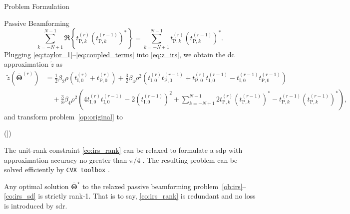 \begin{section}{Problem Formulation}
\begin{subsection}{Passive Beamforming}
		\begin{equation}\label{eq:coupled_terms}
			\sum_{k=-N+1}^{N-1} \Re\left\{t_{\mathrm{P},k}^{(r)} (t_{\mathrm{P},k}^{(r-1)})^*\right\} = \sum_{k=-N+1}^{N-1} t_{\mathrm{P},k}^{(r)} (t_{\mathrm{P},k}^{(r-1)})^*.
		\end{equation}
		Plugging \eqref{eq:taylor_1}--\eqref{eq:coupled_terms} into \eqref{eq:z_irs}, we obtain the \gls{dc} approximation $\tilde{z}$ as
		\begin{equation}
			\begin{split}
				\tilde{z}(\bar{\mathbf{\Theta}}^{(r)})
				& = \frac{1}{2}{\beta_2}{\rho}(t_{\mathrm{I},0}^{(r)}+t_{\mathrm{P},0}^{(r)}) + \frac{3}{2}{\beta_4}{\rho^2} \left(t_{\mathrm{I},0}^{(r)} t_{\mathrm{P},0}^{(r-1)} + t_{\mathrm{P},0}^{(r)} t_{\mathrm{I},0}^{(r-1)} - t_{\mathrm{I},0}^{(r-1)} t_{\mathrm{P},0}^{(r-1)}\right)\\
				& \quad + \frac{3}{8}{\beta_4}{\rho^2} \left(4 t_{\mathrm{I},0}^{(r)}t_{\mathrm{I},0}^{(r-1)} - 2 (t_{\mathrm{I},0}^{(r-1)})^2 + \sum_{k=-N+1}^{N-1}{2 t_{\mathrm{P},k}^{(r)} (t_{\mathrm{P},k}^{(r-1)})^* - t_{\mathrm{P},k}^{(r-1)} (t_{\mathrm{P},k}^{(r-1)})^*}\right), \label{eq:z_irs_approx}
			\end{split}
		\end{equation}
		and transform problem~\eqref{op:original} to
		\begin{maxi!}
			{\scriptstyle{\bar{\mathbf{\Theta}}}}{(\bar{\mathbf{\Theta}})}{\label{op:irs}}{\label{ob:irs}}
			\label{co:irs_rate}
			\label{co:irs_modulus}
			\label{co:irs_sd}
		\end{maxi!}
		The unit-rank constraint \eqref{co:irs_rank} can be relaxed to formulate a \gls{sdp} with approximation accuracy no greater than $\pi/4$ \cite{Luo2010b}.
		The resulting problem can be solved efficiently by \texttt{CVX toolbox} \cite{Grant2016}.

		\begin{proposition}\label{pr:relaxation}
			Any optimal solution $\bar{\mathbf{\Theta}}^\star$ to the relaxed passive beamforming problem~\eqref{ob:irs}--\eqref{co:irs_sd} is strictly rank-\num{1}.
			That is to say, \eqref{co:irs_rank} is redundant and no loss is introduced by \gls{sdr}.
		\end{proposition}


\end{subsection}
\end{section}
